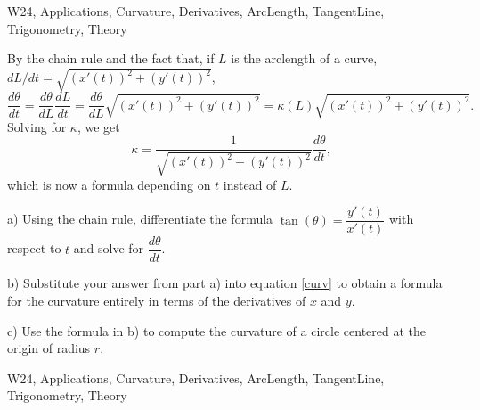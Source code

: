 \begin{tagblock}{W24, Applications, Curvature, Derivatives, ArcLength, TangentLine, Trigonometry, Theory}
\begin{question}
	


By the chain rule and the fact that, if $L$ is the arclength of a curve, $dL/dt=\sqrt{(x'(t))^2+(y'(t))^2}$,
\[
\frac{d\theta}{dt}=\frac{d\theta}{dL}\frac{dL}{dt}=\frac{d\theta}{dL}\sqrt{(x'(t))^2+(y'(t))^2}=\kappa(L)\sqrt{(x'(t))^2+(y'(t))^2}.
\]
Solving for $\kappa$, we get
\begin{equation}\label{curv}
\kappa=\frac{1} {\sqrt{(x'(t))^2+(y'(t))^2}}\frac{d\theta}{dt},
\end{equation}
which is now a formula depending on $t$ instead of $L$.
\bigskip

a) Using the chain rule, differentiate the formula $\tan(\theta)=\dfrac{y'(t)}{x'(t)}$ with respect to $t$ and solve for $\dfrac{d\theta}{dt}$.

\bigskip

b) Substitute your answer from part a) into equation \eqref{curv} to obtain a formula for the curvature entirely in terms of the derivatives of $x$ and $y$.

\bigskip

c) Use the formula in b) to compute the curvature of a circle centered at the origin of radius $r$. 

    
\begin{tags}
       W24, Applications, Curvature, Derivatives, ArcLength, TangentLine, Trigonometry, Theory
\end{tags}
    
\begin{diary}
\end{diary}
	
\begin{solution}

\end{solution}
	
\end{question}

\end{tagblock}

